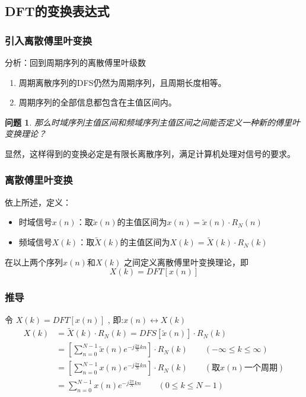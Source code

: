 \documentclass[notheorems,compress,mathserif,table]{beamer}
\newtheorem{wenti}{问题}
\begin{document}
\subsection{DFT的变换表达式}
\begin{frame}[shrink]\frametitle{引入离散傅里叶变换}%
分析：回到周期序列的离散傅里叶级数
\begin{enumerate}
  \item 周期离散序列的DFS仍然为周期序列，且周期长度相等。
  \item 周期序列的全部信息都包含在主值区间内。
\end{enumerate}
\begin{wenti}
那么时域序列主值区间和频域序列主值区间之间能否定义一种新的傅里叶变换理论？
\end{wenti}

显然，这样得到的变换必定是有限长离散序列，满足计算机处理对信号的要求。
\end{frame}




\begin{frame}[shrink]\frametitle{离散傅里叶变换}%

依上所述，定义：
    \begin{itemize}
      \item 时域信号$x(n)$：取$\tilde{x}(n)$的主值区间为$x(n) =\tilde{x}(n)\cdot R_N(n)$
      \item 频域信号$X(k) $：取$\tilde{X}(k)$的主值区间为$X(k) =\tilde{X}(k)\cdot R_N(k)$
    \end{itemize}

    在以上两个序列$x(n)$和$X(k)$ 之间定义离散傅里叶变换理论，即
     $$X(k) = DFT[x(n)]$$ %
\end{frame}

\begin{frame}[shrink]\frametitle{推导}%
    令 $X(k) = DFT[x(n)]$ , \quad 即:$x(n)\longleftrightarrow X(k)$
    \begin{equation*}
    \begin{split}
    X(k) &= \tilde{X}(k)\cdot R_N(k) =  DFS[\tilde{x}(n)]\cdot R_N(k)\\
         &= \left[\sum_{n=0}^{N-1}\tilde{x}(n)e^{-j\frac{2\pi}{N}kn}\right]\cdot R_N(k)\quad\quad (-\infty \leq k \leq \infty)\\
         &= \left[\sum_{n=0}^{N-1}x(n)e^{-j\frac{2\pi}{N}kn}\right]\cdot R_N(k)\quad\quad (\mbox{取$x(n)$一个周期})\\
         &= \sum_{n=0}^{N-1}x(n)e^{-j\frac{2\pi}{N}kn} \quad\quad (0 \leq k \leq N-1)\\
    \end{split}
    \end{equation*}
\end{frame}    
    
\end{document}

